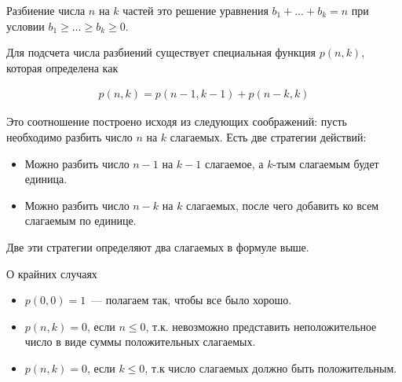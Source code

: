 
\begin{definition}
  Разбиение числа \(n\) на \(k\) частей это решение уравнения
  \(b_{1} + \dotsc + b_{k} = n\) при условии
  \(b_{1} \ge \dots \ge b_{k} \ge 0\).
\end{definition}

Для подсчета числа разбиений существует специальная функция \(p(n, k)\), которая
определена как

\begin{align*}
  p(n, k) = p(n - 1, k - 1) + p(n - k, k)
\end{align*}

Это соотношение построено исходя из следующих соображений: пусть необходимо
разбить число \(n\) на \(k\) слагаемых. Есть две стратегии действий:

\begin{itemize}
  \item Можно разбить число \(n - 1\) на \(k - 1\) слагаемое, а \(k\)-тым
  слагаемым будет единица.

  \item Можно разбить число \(n - k\) на \(k\) слагаемых, после чего добавить ко
  всем слагаемым по единице.
\end{itemize}

Две эти стратегии определяют два слагаемых в формуле выше.

\begin{remark}
  О крайних случаях

  \begin{itemize}
    \item \(p(0, 0) = 1\)~--- полагаем так, чтобы все было хорошо.
    
    \item \(p(n, k) = 0\), если \(n \le 0\), т.к. невозможно представить
    неположительное число в виде суммы положительных слагаемых.

    \item \(p(n, k) = 0\), если \(k \le 0\), т.к число слагаемых должно быть
    положительным.
  \end{itemize}
\end{remark}
